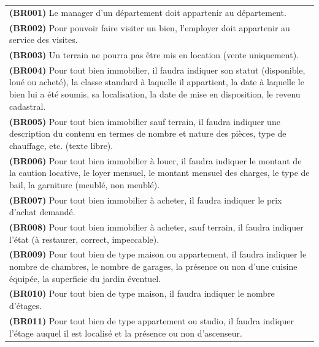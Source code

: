 \begin{table}
  \centering
  \begin{tabular}{|p{}|}
  \hline
  \rowcolor{gray05} \multicolumn{1}{|c|}{\textbf{Contraintes}} \\
  \hline
  \hline
  \textbf{(BR001)} Le manager d'un département doit appartenir au département. \\
  \textbf{(BR002)} Pour pouvoir faire visiter un bien, l'employer doit appartenir au service des visites. \\
  \textbf{(BR003)} Un terrain ne pourra pas être mis en location (vente uniquement). \\
  \textbf{(BR004)} Pour tout bien immobilier, il faudra indiquer son statut (disponible, loué ou acheté), la classe standard à laquelle il appartient,
la date à laquelle le bien lui a été soumis, sa localisation, la date de mise en disposition, le revenu cadastral. \\
  \textbf{(BR005)} Pour tout bien immobilier sauf terrain, il faudra indiquer une description du contenu en termes de nombre et nature des
pièces, type de chauffage, etc. (texte libre). \\
  \textbf{(BR006)} Pour tout bien immobilier à louer, il faudra indiquer le montant de la caution locative, le loyer mensuel, le montant mensuel
des charges, le type de bail, la \og{}garniture\fg{} (meublé, non meublé). \\
  \textbf{(BR007)} Pour tout bien immobilier à acheter, il faudra indiquer le prix d'achat demandé. \\
  \textbf{(BR008)} Pour tout bien immobilier à acheter, sauf terrain, il faudra indiquer l'état (à restaurer, correct, impeccable). \\
  \textbf{(BR009)} Pour tout bien de type \og{}maison\fg{} ou \og{}appartement\fg{}, il faudra indiquer le nombre de chambres, le nombre de garages, la présence ou non d'une cuisine équipée, la superficie du jardin éventuel. \\
  \textbf{(BR010)} Pour tout bien de type \og{}maison\fg{}, il faudra indiquer le nombre d'étages. \\
  \textbf{(BR011)} Pour tout bien de type \og{}appartement\fg{} ou \og{}studio\fg{}, il faudra indiquer l'étage auquel il est localisé et la présence ou non d'ascenseur. \\

\end{tabular}
\end{table}
